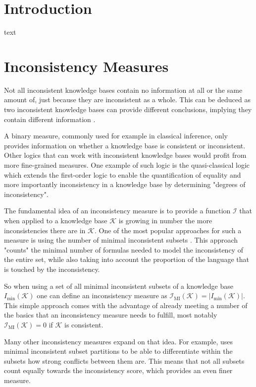 \section{Introduction}
text

\section{Inconsistency Measures}
Not all inconsistent knowledge bases contain no information at all or the same amount of, just because they are inconsistent as a whole. This can be deduced as two inconsistent knowledge bases can provide different conclusions, implying they contain different information \cite{bertossi_approaches_2005}.

A binary measure, commonly used for example in classical inference, only provides information on whether a knowledge base is consistent or inconsistent. Other logics that can work with inconsistent knowledge bases would profit from more fine-grained measures.
One example of such logic is the quasi-classical logic \cite{grant_measuring_2006} which extends the first-order logic to enable the quantification of equality and more importantly inconsistency in a knowledge base by determining "degrees of inconsistency".

The fundamental idea of an inconsistency measure is to provide a function \(\mathcal{I}\) that when applied to a knowledge base \(\mathcal{K}\) is growing in number the more inconsistencies there are in \(\mathcal{K}\). One of the most popular approaches for such a measure is using the number of minimal inconsistent subsets \cite{hunter_measuring_2008}. This approach "counts" the minimal number of formulas needed to model the inconsistency of the entire set, while also taking into account the proportion of the language that is touched by the inconsistency.

So when using a set of all minimal inconsistent subsets of a knowledge base \(I_{\min}(\mathcal{K})\) one can define an inconsistency measure as \(\mathcal{I}_{\text{MI}}(\mathcal{K}) = \left| I_{\min}(\mathcal{K}) \right|\). This simple approach comes with the advantage of already meeting a number of the basics that an inconsistency measure needs to fulfill, most notably \(\mathcal{I}_{\text{MI}}(\mathcal{K}) = 0\) if \(\mathcal{K}\) is consistent.

Many other inconsistency measures expand on that idea. For example, \cite{jabbour_mis_2016} uses minimal inconsistent subset partitions to be able to differentiate within the subsets how strong conflicts between them are. This means that not all subsets count equally towards the inconsistency score, which provides an even finer measure.

